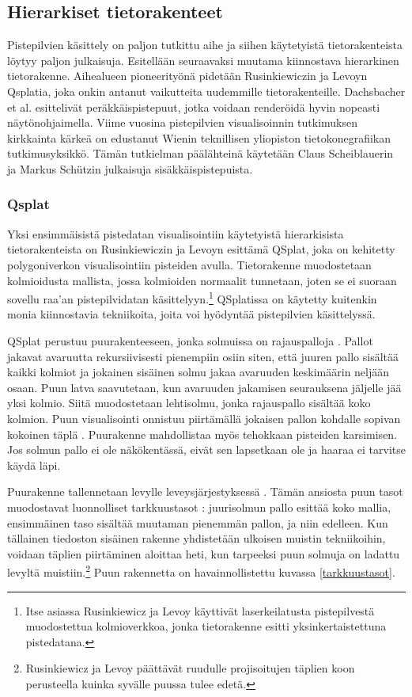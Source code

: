 \subsection{Hierarkiset tietorakenteet}\label{tietorakenteet}

Pistepilvien käsittely on paljon tutkittu aihe ja siihen käytetyistä tietorakenteista löytyy paljon julkaisuja. Esitellään seuraavaksi muutama kiinnostava hierarkinen tietorakenne. Aihealueen pioneerityönä pidetään Rusinkiewiczin ja Levoyn Qsplatia, joka onkin antanut vaikutteita uudemmille tietorakenteille. Dachsbacher et al. esittelivät peräkkäispistepuut, jotka voidaan renderöidä hyvin nopeasti näytönohjaimella. Viime vuosina pistepilvien visualisoinnin tutkimuksen kirkkainta kärkeä on edustanut Wienin teknillisen yliopiston tietokonegrafiikan tutkimusyksikkö. Tämän tutkielman päälähteinä käytetään Claus Scheiblauerin ja Markus Schützin julkaisuja sisäkkäispistepuista.

\subsubsection{Qsplat}
Yksi ensimmäisistä pistedatan visualisointiin käytetyistä hierarkisista tietorakenteista on Rusinkiewiczin ja Levoyn esittämä QSplat, joka on kehitetty polygoniverkon visualisointiin pisteiden avulla. Tietorakenne muodostetaan kolmioidusta mallista, jossa kolmioiden normaalit tunnetaan, joten se ei suoraan sovellu raa'an pistepilvidatan käsittelyyn.\footnote{Itse asiassa Rusinkiewicz ja Levoy käyttivät laserkeilatusta pistepilvestä muodostettua kolmioverkkoa, jonka tietorakenne esitti yksinkertaistettuna pistedatana.} QSplatissa on käytetty kuitenkin monia kiinnostavia tekniikoita, joita voi hyödyntää pistepilvien käsittelyssä. \cite{qsplat}

QSplat perustuu puurakenteeseen, jonka solmuissa on rajauspalloja . Pallot jakavat avaruutta rekursiivisesti pienempiin osiin siten, että juuren pallo sisältää kaikki kolmiot ja jokainen sisäinen solmu jakaa avaruuden keskimäärin neljään osaan. Puun latva saavutetaan, kun avaruuden jakamisen seurauksena jäljelle jää yksi kolmio. Siitä muodostetaan lehtisolmu, jonka rajauspallo sisältää koko kolmion. Puun visualisointi onnistuu piirtämällä jokaisen pallon kohdalle sopivan kokoinen täplä . Puurakenne mahdollistaa myös tehokkaan pisteiden karsimisen. Jos solmun pallo ei ole näkökentässä, eivät sen lapsetkaan ole ja haaraa ei tarvitse käydä läpi. \cite{qsplat}

Puurakenne tallennetaan levylle leveysjärjestyksessä . Tämän ansiosta puun tasot muodostavat luonnolliset tarkkuustasot : juurisolmun pallo esittää koko mallia, ensimmäinen taso sisältää muutaman pienemmän pallon, ja niin edelleen. Kun tällainen tiedoston sisäinen rakenne yhdistetään ulkoisen muistin tekniikoihin, voidaan täplien piirtäminen aloittaa heti, kun tarpeeksi puun solmuja on ladattu levyltä muistiin.\footnote{Rusinkiewicz ja Levoy päättävät ruudulle projisoitujen täplien koon perusteella kuinka syvälle puussa tulee edetä.} Puun rakennetta on havainnollistettu kuvassa \ref{tarkkuustasot}. \cite{qsplat}

